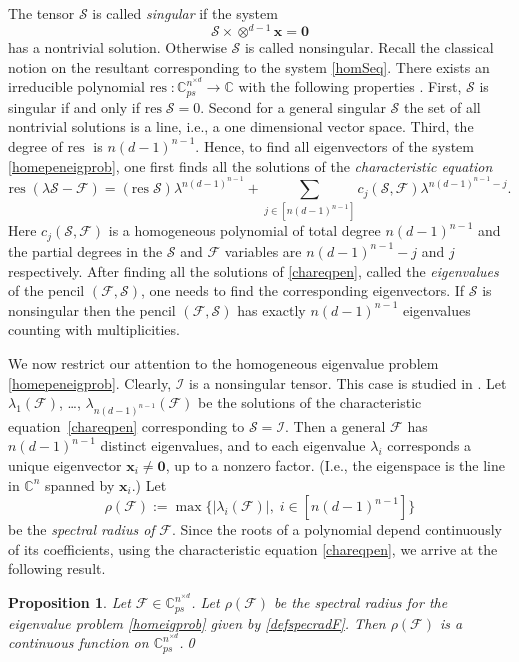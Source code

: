 \documentclass{amsart}
\newcommand{\C}{\mathbb{C}}
\newcommand{\x}{\mathbf{x}}
\newcommand{\0}{\mathbf{0}}
\newcommand{\1}{\mathbf{1}}
\newcommand{\cF}{\mathcal{F}}
\newcommand{\cI}{\mathcal{I}}
\newcommand{\cS}{\mathcal{S}}
\newcommand{\res}{\mathrm{res\;}}
\newtheorem{proposition}[theo]{Proposition}
\theoremstyle{remark}
\numberwithin{equation}{section} %
\begin{document}
The tensor $\cS$ is called \emph{singular} if the system
 \begin{equation}\label{homSeq}
 \cS\times\otimes^{d-1}\x=\0
 \end{equation}
 has a nontrivial solution.  Otherwise $\cS$ is called nonsingular.  Recall the classical notion on the resultant corresponding
 to the system \eqref{homSeq}.  There exists an irreducible polynomial $\res :\C^{n^{\times d}}_{ps}\to \C$ with the following properties
 \cite[Chapter 13]{GKZ}.  First, $\cS$ is singular if and only if $\res \cS=0$.  Second for a general singular $\cS$ the set of all nontrivial
 solutions is a line, i.e., a one dimensional vector space.  Third, the degree of $\res $ is $n (d-1)^{n-1}$.
 Hence, to find all eigenvectors of the system \eqref{homepeneigprob},
one first finds all the solutions of the \emph{characteristic equation}
 \begin{equation}\label{chareqpen}
 \res(\lambda\cS-\cF)=(\res \cS)\lambda^{n(d-1)^{n-1}}+\sum_{j\in [n(d-1)^{n-1}]} c_j(\cS,\cF)\lambda^{n(d-1)^{n-1}-j}.
 \end{equation}
 Here $c_j(\cS,\cF)$ is a homogeneous polynomial of total degree $n(d-1)^{n-1}$ and the 
%
%
partial degrees
in the $\cS$ and $\cF$ variables are $n(d-1)^{n-1}-j$ and $j$
 respectively.  After finding all the solutions of \eqref{chareqpen},
called the {\em eigenvalues}
 of the pencil $(\cF,\cS)$, one needs to find the corresponding
 eigenvectors.  If $\cS$ is nonsingular then the pencil $(\cF,\cS)$ has exactly $n(d-1)^{n-1}$ eigenvalues counting with multiplicities.

 We now restrict our attention to the homogeneous eigenvalue problem \eqref{homepeneigprob}.
 Clearly, $\cI$ is a nonsingular tensor.  This case is studied in \cite[\S5]{FO12}.  Let $\lambda_1(\cF)$, \ldots, $\lambda_{n(d-1)^{n-1}}(\cF)$
 be the solutions of the characteristic equation~\eqref{chareqpen} corresponding to $\cS=\cI$.  Then a general $\cF$ has $n(d-1)^{n-1}$ distinct
 eigenvalues, and to each eigenvalue $\lambda_i$ corresponds a unique eigenvector $\x_i\ne \0$, up to a nonzero factor.  (I.e., the eigenspace is the line
in $\C^n$ spanned by $\x_i$.)
%
%
 Let
 \begin{equation}\label{defspecradF}
 \rho(\cF):=\max\{|\lambda_i(\cF)|, \;i\in [n(d-1)^{n-1}]\}
 \end{equation}
 be the \emph{spectral radius of} $\cF$.  
%
Since the roots of a polynomial depend continuously of its coefficients,
using the characteristic equation \eqref{chareqpen},
we arrive at
%
%
%
the following result.
 \begin{proposition}\label{contspecrad}  Let $\cF\in \C^{n^{\times d}}_{ps}$.  Let $\rho(\cF)$ be the spectral radius for the eigenvalue problem \eqref{homeigprob}
 given by \eqref{defspecradF}.  Then $\rho(\cF)$ is a continuous function on $\C^{n^{\times d}}_{ps}$.\hfill\qed
 \end{proposition}
\end{document}
